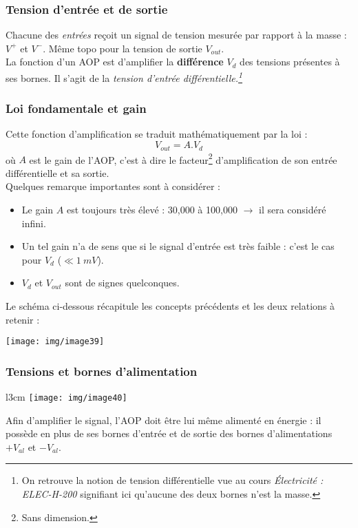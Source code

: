 \subsubsection{Tension d'entrée et de sortie}
Chacune des \textit{entrées} reçoit un signal de tension mesurée par rapport à la masse : $V^+$ et $V^-$. Même topo pour la tension de sortie $V_{out}$.\\
La fonction d'un AOP est d'amplifier la \textbf{différence} $V_d$ des tensions présentes à ses bornes. Il s'agit de la \textit{tension d'entrée différentielle.\footnote{On retrouve la notion de tension différentielle vue au cours \textit{Électricité : ELEC-H-200} signifiant ici qu'aucune des deux bornes n'est la masse.}}

\subsubsection{Loi fondamentale et gain}
Cette fonction d'amplification se traduit mathématiquement par la loi : 
\begin{equation}
	V_{out} = A.V_d
\end{equation}
où $A$ est le gain de l'AOP, c'est à dire le facteur\footnote{Sans dimension.} d'amplification de son entrée différentielle et sa sortie.\\
Quelques remarque importantes sont à considérer :
\begin{itemize}
	\item Le gain $A$ est toujours très élevé : 30,000 à 100,000 $\rightarrow$ il sera considéré infini.
	\item Un tel gain n'a de sens que si le signal d'entrée est très faible : c'est le cas pour $V_d$ ($\ll 1\ mV$).
	\item $V_d$ et $V_{out}$ sont de signes quelconques.
\end{itemize}
Le schéma ci-dessous récapitule les concepts précédents et les deux relations à retenir :
\begin{center}
	\texttt{[image: img/image39]}
\end{center}


\subsubsection{Tensions et bornes d'alimentation}
\begin{wrapfigure}[8]{l}{3cm}
	\texttt{[image: img/image40]}
\end{wrapfigure}
Afin d'amplifier le signal, l'AOP doit être lui même alimenté en énergie : il possède en plus de ses bornes d'entrée et de sortie des bornes d'alimentations $+V_{al}$ et $-V_{al}$. \\

